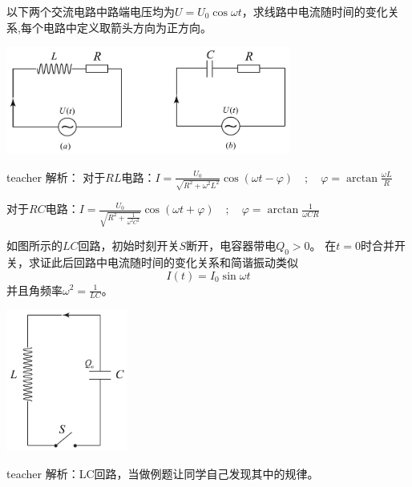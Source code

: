 \begin{example}

以下两个交流电路中路端电压均为$U = U_0\cos\omega t$，求线路中电流随时间的变化关系,每个电路中定义取箭头方向为正方向。
\begin{center}
\includegraphics[width = 0.7\textwidth]{images/alt-current-2.pdf}
\end{center}
\begin{taggedblock}{teacher}
\noindent
解析：
对于$RL$电路：$I = \frac{U_0}{\sqrt{R^2+\omega^2 L^2}}\cos(\omega t-\varphi)\quad ; \quad \varphi=\arctan \frac{\omega L}{R}$

对于$RC$电路：$I = \frac{U_0}{\sqrt{R^2+\frac{1}{\omega^2 C^2}}}\cos(\omega t+\varphi)\quad ; \quad \varphi=\arctan \frac{1}{\omega CR}$
\end{taggedblock}
\end{example}


\begin{example}
如图所示的$LC$回路，初始时刻开关$S$断开，电容器带电$Q_0>0$。
在$t=0$时合并开关，求证此后回路中电流随时间的变化关系和简谐振动类似
\[
I(t) = I_0\sin\omega t
\]
并且角频率$\omega^2 = \frac{1}{LC}$。
\begin{flushright}
\includegraphics[width = 0.3\textwidth]{images/alt-current-3.pdf} 
\end{flushright}

\begin{taggedblock}{teacher}
\noindent
解析：LC回路，当做例题让同学自己发现其中的规律。
\end{taggedblock}
\end{example}


